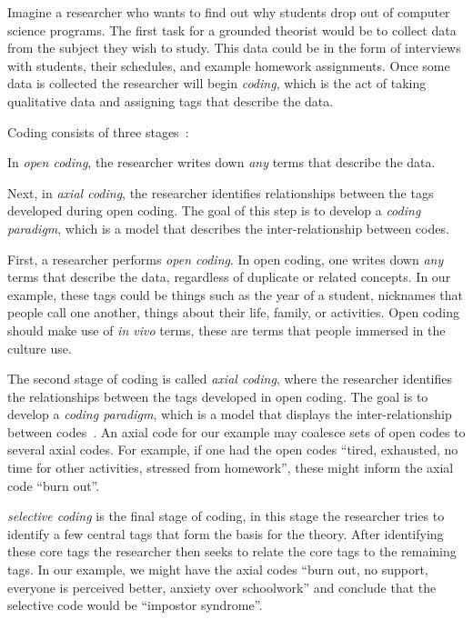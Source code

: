 \documentclass[sigconf]{acmart}
\begin{document}
Imagine a researcher who wants to find out why students drop out of computer
science programs. The first task for a grounded theorist would be to collect
data from the subject they wish to study. This data could be in the form of
interviews with students, their schedules, and example homework assignments.
Once some data is collected the researcher will begin \emph{coding}, which is
the act of taking qualitative data and assigning tags that describe the data.


Coding consists of three stages~\cite{corbin2014basics}:
%
\begin{enumerate*}
%
\item In \emph{open coding}, the researcher writes down \emph{any} terms that
describe the data.
%
\item Next, in \emph{axial coding}, the researcher identifies relationships
between the tags developed during open coding. The goal of this step is to
develop a \emph{coding paradigm}, which is a model that describes the
inter-relationship between codes.

\end{enumerate*}


First, a researcher
performs \emph{open coding}. In open coding, one writes down \emph{any}
terms that describe the data, regardless of duplicate or related concepts. In
our example, these tags could be things such as the year of a student, nicknames
that people call one another, things about their life, family, or activities.
Open coding should make use of \emph{in vivo} terms, these are terms that
people immersed in the culture use.
 

The second stage of coding is called \emph{axial coding}, where the researcher
identifies the relationships between the tags developed in open coding. The
goal is to develop a \emph{coding paradigm}, which is a model that displays the
inter-relationship between codes~\cite{corbin2014basics}. An axial code for our
example may coalesce sets of open codes to several axial codes. For example, if
one had the open codes ``tired, exhausted, no time for other activities,
stressed from homework'', these might inform the axial code ``burn out''.
 
\emph{selective coding} is the final stage of coding, in this stage the
researcher tries to identify a few central tags that form the basis for the
theory. After identifying these core tags the researcher then seeks to relate
the core tags to the remaining tags. In our example, we might have the axial
codes ``burn out, no support, everyone is perceived better, anxiety over
schoolwork'' and conclude that the selective code would be ``impostor
syndrome''.
 
\end{document}

